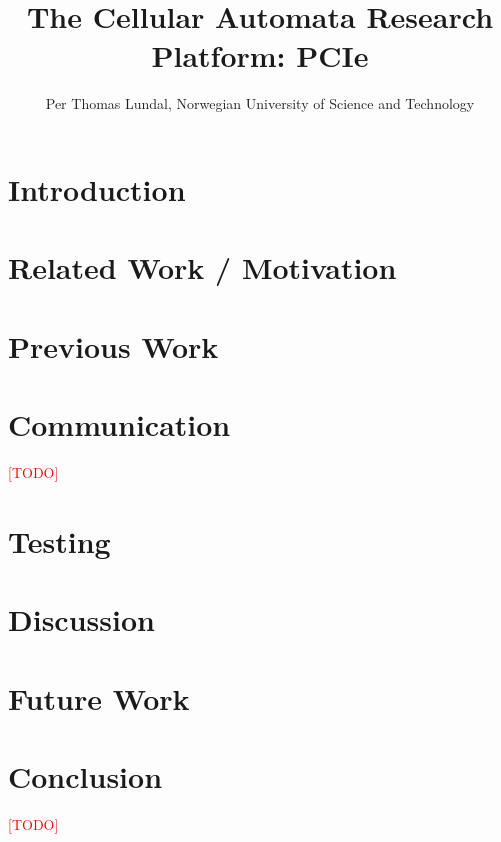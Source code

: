 \documentclass[a4paper]{IEEEtran}
\title{The Cellular Automata Research Platform: PCIe}
\author{Per Thomas Lundal, Norwegian University of Science and Technology}
\newcommand\TODO{\textcolor{red}{[TODO]}}
\begin{document}
\maketitle

\begin{abstract}

    

\end{abstract}

\section{Introduction}

    

\section{Related Work / Motivation}

    

\section{Previous Work}

    

\section{Communication}

\TODO

\section{Testing}

    

\section{Discussion}

    

\section{Future Work}

    

\section{Conclusion}

\TODO



\end{document}
